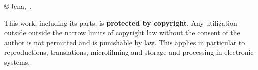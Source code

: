 \begin{titlepage}
\newcommand{\mydate}{\monthname\,\the\day , \the\year}

\begin{center}
\copyright\,Jena, \mydate
\end{center}

\vspace{-.5cm}
\singlespacing
\small
\noindent This work, including its parts, is \textbf{protected by copyright}. Any utilization outside
outside the narrow limits of copyright law without the consent of the author is not permitted and is
punishable by law. This applies in particular to reproductions, translations, microfilming and storage and processing in electronic systems.

\end{titlepage}
